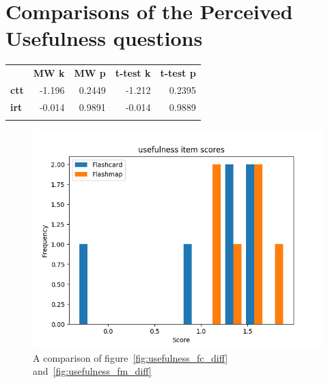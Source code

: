 \FloatBarrier
\section{Comparisons of the Perceived Usefulness questions}


\begin{longtable}[c]{@{}lrrrr@{}}
\toprule\addlinespace
& \textbf{MW k} & \textbf{MW p} &
\textbf{t-test k} & \textbf{t-test p}
\\\addlinespace
\midrule
\textbf{ctt} & -1.196 & 0.2449 & -1.212 & 0.2395
\\\addlinespace
\textbf{irt} & -0.014 & 0.9891 & -0.014 & 0.9889
\\\addlinespace
\bottomrule
    \label{tab:usefulness_comp}
\end{longtable}

\begin{figure}
    \includegraphics[width=\textwidth]{img/usefulness_diff.png}
    \caption{A comparison of figure~\protect\ref{fig:usefulness_fc_diff} and~\protect\ref{fig:usefulness_fm_diff}}
    \label{fig:usefulness_diff}
\end{figure}
